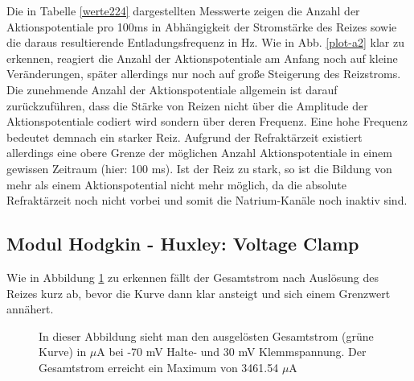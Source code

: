\documentclass[11pt]{article}
\begin{document}
Die in Tabelle \ref{werte224} dargestellten Messwerte zeigen die Anzahl der Aktionspotentiale pro 100ms in Abhängigkeit der Stromstärke des Reizes sowie die daraus resultierende Entladungsfrequenz in Hz. Wie in Abb. \ref{plot-a2} klar zu erkennen, reagiert die Anzahl der Aktionspotentiale am Anfang noch auf kleine Veränderungen, später allerdings nur noch auf große Steigerung des Reizstroms. Die zunehmende Anzahl der Aktionspotentiale allgemein ist darauf zurückzuführen, dass die Stärke von Reizen nicht über die Amplitude der Aktionspotentiale codiert wird sondern über deren Frequenz. Eine hohe Frequenz bedeutet demnach ein starker Reiz. Aufgrund der Refraktärzeit existiert allerdings eine obere Grenze der möglichen Anzahl Aktionspotentiale in einem gewissen Zeitraum (hier: 100 ms).  Ist der Reiz zu stark, so ist die Bildung von mehr als einem Aktionspotential nicht mehr möglich, da die absolute Refraktärzeit noch nicht vorbei und somit die Natrium-Kanäle noch inaktiv sind.

\subsection{Modul Hodgkin - Huxley: Voltage Clamp}

Wie in Abbildung \ref{graph32} zu erkennen fällt der Gesamtstrom nach Auslösung des Reizes kurz ab, bevor die Kurve dann klar  ansteigt und sich einem Grenzwert annähert. 

\begin{figure}[H]
\caption{In dieser Abbildung sieht man den ausgelösten Gesamtstrom (grüne Kurve) in $\mu$A bei -70 mV Halte- und 30 mV Klemmspannung. Der Gesamtstrom erreicht ein Maximum von 3461.54 $\mu$A}
\label{graph32}
\end{figure}
\end{document}
